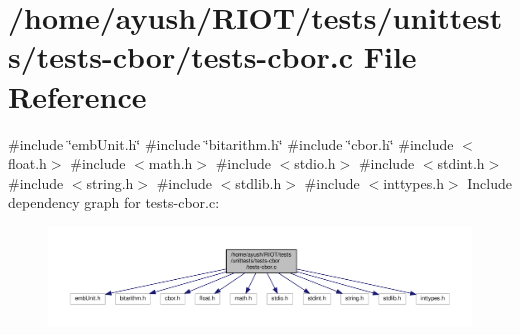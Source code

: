 \hypertarget{tests-cbor_8c}{}\section{/home/ayush/\+R\+I\+O\+T/tests/unittests/tests-\/cbor/tests-\/cbor.c File Reference}
\label{tests-cbor_8c}
{\ttfamily \#include \char`\"{}emb\+Unit.\+h\char`\"{}}\newline
{\ttfamily \#include \char`\"{}bitarithm.\+h\char`\"{}}\newline
{\ttfamily \#include \char`\"{}cbor.\+h\char`\"{}}\newline
{\ttfamily \#include $<$float.\+h$>$}\newline
{\ttfamily \#include $<$math.\+h$>$}\newline
{\ttfamily \#include $<$stdio.\+h$>$}\newline
{\ttfamily \#include $<$stdint.\+h$>$}\newline
{\ttfamily \#include $<$string.\+h$>$}\newline
{\ttfamily \#include $<$stdlib.\+h$>$}\newline
{\ttfamily \#include $<$inttypes.\+h$>$}\newline
Include dependency graph for tests-\/cbor.c\+:
\nopagebreak
\begin{figure}[H]
\begin{center}
\leavevmode
\includegraphics[width=350pt]{tests-cbor_8c__incl}
\end{center}
\end{figure}
